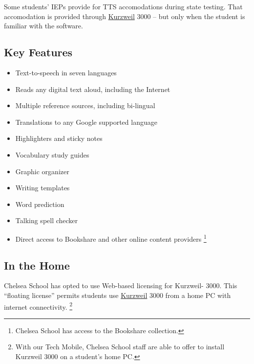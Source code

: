 \documentclass[letterpaper,10pt,english]{sphinxmanual}
\begin{document}
Some students' IEPs provide for TTS accomodations during state testing. That accomodation is provided through \href{http://www.kurzweiledu.com/products/kurzweil-3000-firefly-overview.html}{Kurzweil} 3000 -- but only when the student is familiar with the software.


\subsection{Key Features}
\label{kurzweil:key-features}\begin{itemize}
\item {} 
Text-to-speech in seven languages

\item {} 
Reads any digital text aloud, including the Internet

\item {} 
Multiple reference sources, including bi-lingual

\item {} 
Translations to any Google supported language

\item {} 
Highlighters and sticky notes

\item {} 
Vocabulary study guides

\item {} 
Graphic organizer

\item {} 
Writing templates

\item {} 
Word prediction

\item {} 
Talking spell checker

\item {} 
Direct access to Bookshare and other online content providers \footnote{
Chelsea School has access to the Bookshare collection.
}

\end{itemize}


\subsection{In the Home}
\label{kurzweil:in-the-home}
Chelsea School has opted to use Web-based licensing for Kurzweil- 3000. This ``floating license'' permits students use \href{http://www.kurzweiledu.com/products/kurzweil-3000-firefly-overview.html}{Kurzweil} 3000 from a home PC with internet connectivity. \footnote{
With our Tech Mobile, Chelsea School staff are able to offer to install Kurzweil 3000 on a student's home PC.
}
\end{document}

